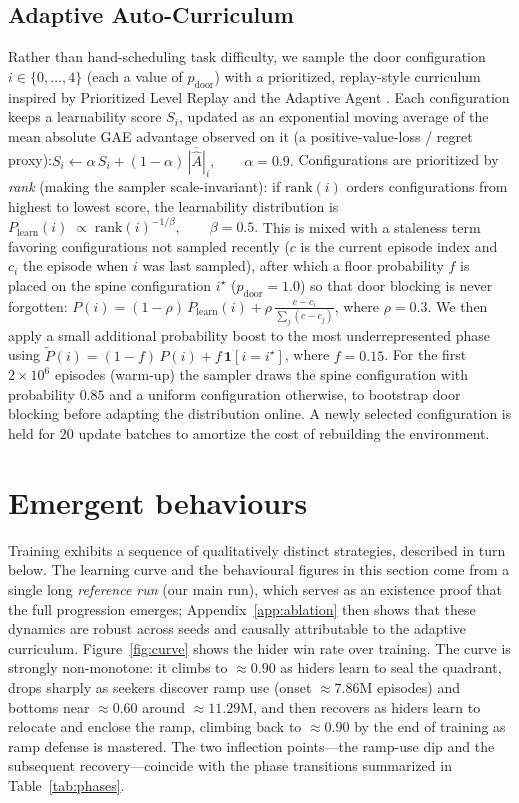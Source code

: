 \documentclass{article}
\begin{document}
\subsection{Adaptive Auto-Curriculum}
Rather than hand-scheduling task difficulty, we sample the door configuration
$i\in\{0,\dots,4\}$ (each a value of $p_{\text{door}}$) with a prioritized,
replay-style curriculum inspired by Prioritized Level Replay \citep{jiang2021plr}
and the Adaptive Agent \citep{ada2023}. Each configuration keeps a learnability
score $S_i$, updated as an exponential moving average of the mean absolute GAE
advantage observed on it (a positive-value-loss / regret proxy):$ S_i \leftarrow \alpha\,S_i + (1-\alpha)\,\overline{|\hat{A}|}_i,
  \qquad \alpha = 0.9 .$
Configurations are prioritized by \emph{rank} (making the sampler
scale-invariant): if $\text{rank}(i)$ orders configurations from highest to
lowest score, the learnability distribution is
$
  P_{\text{learn}}(i) \;\propto\; \text{rank}(i)^{-1/\beta},
  \qquad \beta = 0.5 .
$
This is mixed with a staleness term favoring configurations not sampled recently
($c$ is the current episode index and $c_i$ the episode when $i$ was last
sampled), after which a floor probability $f$ is placed on the spine
configuration $i^\star$ ($p_{\text{door}}=1.0$) so that door blocking is never forgotten: 
$P(i) = (1-\rho)\,P_{\text{learn}}(i) + \rho\,\frac{c-c_i}{\sum_j(c-c_j)}$, 
where $\rho=0.3$. We then apply a small additional probability boost to the most
underrepresented phase using 
$\tilde{P}(i) = (1-f)\,P(i) + f\,\mathbf{1}[i=i^\star]$, 
where $f=0.15$.
For the first $2\times10^6$ episodes (warm-up) the sampler draws the spine
configuration with probability $0.85$ and a uniform configuration otherwise, to
bootstrap door blocking before adapting the distribution online. A newly
selected configuration is held for $20$ update batches to amortize the cost of
rebuilding the environment.

\section{Emergent behaviours}
\label{sec:results}
Training exhibits a sequence of qualitatively distinct strategies, described in
turn below. The learning curve and the behavioural figures in this section come
from a single long \emph{reference run} (our main run), which serves as an
existence proof that the full progression emerges; Appendix~\ref{app:ablation} then
shows that these dynamics are robust across seeds and causally attributable to the
adaptive curriculum. Figure~\ref{fig:curve} shows the hider win rate over
training. The curve is strongly non-monotone: it climbs to $\approx0.90$ as hiders
learn to seal the quadrant, drops sharply as seekers discover ramp use (onset
$\approx7.86$M episodes) and bottoms near $\approx0.60$ around $\approx11.29$M, and
then recovers as hiders learn to relocate and enclose the ramp, climbing back to
$\approx0.90$ by the end of training as ramp defense is mastered.
The two inflection points---the ramp-use dip and the subsequent recovery---coincide
with the phase transitions summarized in Table~\ref{tab:phases}.
\end{document}
